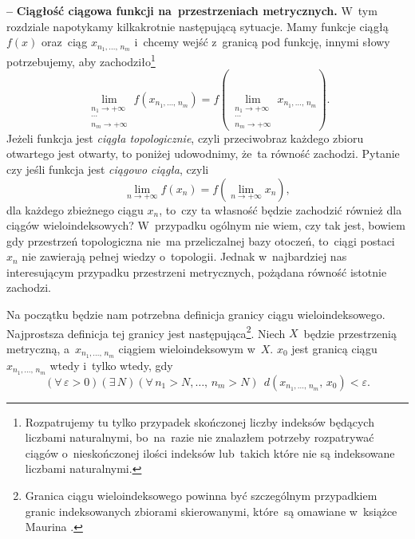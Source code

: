 \documentclass[a4paper,11pt]{article}
\newcommand{\ld}{\ldots}
\newcommand{\tb}{\textbf}
\newcommand{\noi}{\noindent}
\newcommand{\ld}{\ldots}
\newcommand{\tb}{\textbf}
\newcommand{\noi}{\noindent}
\newcommand{\start}{\noi \tb{--} {}}
\newcommand{\ra}{\rightarrow}
\newcommand{\wtw}{wtedy i~tylko wtedy}
\newcommand{\veps}{\varepsilon}
\newcommand{\Lim}{\lim\limits}
\begin{document}
\start \tb{Ciągłość ciągowa funkcji na~przestrzeniach metrycznych.}
W~tym rozdziale napotykamy kilkakrotnie następującą sytuacje. Mamy
funkcje ciągłą $f( x )$ oraz~ciąg $x_{ n_{ 1 }, \ld, \, n_{ m } }$
i~chcemy wejść z~granicą pod funkcję, innymi słowy potrzebujemy, aby
zachodziło\footnote{Rozpatrujemy tu tylko przypadek skończonej liczby
  indeksów będących liczbami naturalnymi, bo~na~razie nie znalazłem
  potrzeby rozpatrywać ciągów o~nieskończonej ilości indeksów
  lub~takich które nie są indeksowane liczbami naturalnymi.}
\begin{equation*}
  \Lim_{ \substack{ n_{ 1 } \ra +\infty \\ \cdots \\  n_{ m } \ra +\infty } }
  f( x_{ n_{ 1 }, \ld, \, n_{ m } } )
  = f( \Lim_{ \substack{ n_{ 1 } \ra +\infty \\ \cdots \\ n_{ m } \ra +\infty } }
  x_{ n_{ 1 }, \ld, \, n_{ m } } ).
\end{equation*}
Jeżeli funkcja jest \emph{ciągła topologicznie}, czyli przeciwobraz
każdego zbioru otwartego jest otwarty, to poniżej udowodnimy, że~ta
równość zachodzi. Pytanie czy jeśli funkcja jest \emph{ciągowo
  ciągła}, czyli
\begin{equation*}
  \Lim_{ n \ra +\infty } f( x_{ n } ) = f( \Lim_{ n \ra +\infty } x_{ n } ),
\end{equation*}
dla każdego zbieżnego ciągu $x_{ n }$, to~czy ta własność będzie
zachodzić również dla ciągów wieloindeksowych? W~przypadku ogólnym nie
wiem, czy tak jest, bowiem gdy przestrzeń topologiczna nie~ma
przeliczalnej bazy otoczeń, to~ciągi postaci $x_{ n }$ nie zawierają
pełnej wiedzy o~topologii. Jednak w~najbardziej nas interesującym
przypadku przestrzeni metrycznych, pożądana równość istotnie zachodzi.

Na początku będzie nam potrzebna definicja granicy ciągu
wieloindeksowego. Najprostsza definicja tej granicy jest
następująca\footnote{Granica ciągu wieloindeksowego powinna być
  szczególnym przypadkiem granic indeksowanych zbiorami skierowanymi,
  które~są omawiane w~książce Maurina \cite{Maurin74}.}. Niech
$X$~będzie przestrzenią metryczną, a~$x_{ n_{ 1 }, \ld, \, n_{ m } }$
ciągiem wieloindeksowym w~$X$. $x_{ 0 }$ jest granicą ciągu
$x_{ n_{ 1 }, \ld, \, n_{ m } }$ \wtw, gdy
\begin{equation*}
  ( \forall \, \veps > 0) ( \exists \, N )
  ( \forall \, n_{ 1 } > N, \ld, \, n_{ m } > N ) \;\,
  d( x_{ n_{ 1 }, \ld, \, n_{ m } }, \, x_{ 0 } ) < \veps.
\end{equation*}
\end{document}
